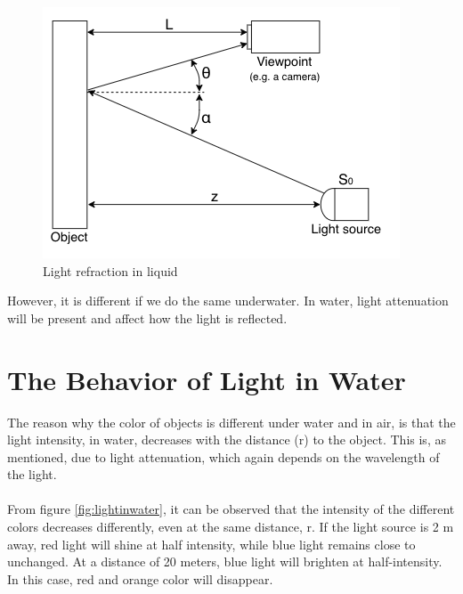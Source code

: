 \begin{figure}[H]
\centering
  \includegraphics[width=\linewidth]{Images/theory/reflectance.png}
  \caption{Light refraction in liquid}
  \label{fig:reflectance}
\end{figure}



However, it is different if we do the same underwater. In water, light attenuation will be present and affect how the light is reflected.

\section{The Behavior of Light in Water}


The reason why the color of objects is different under water and in air, is that the light intensity, in water, decreases with the distance (r) to the object. This is, as mentioned, due to light attenuation, which again depends on the wavelength of the light. %
\\\\
From figure \ref{fig:lightinwater}, it can be observed that the intensity of the different colors decreases differently, even at the same distance, r. If the light source is 2 m away, red light will shine at half intensity, while blue light remains close to unchanged. At a distance of 20 meters, blue light will brighten at half-intensity. In this case, red and orange color will disappear.

